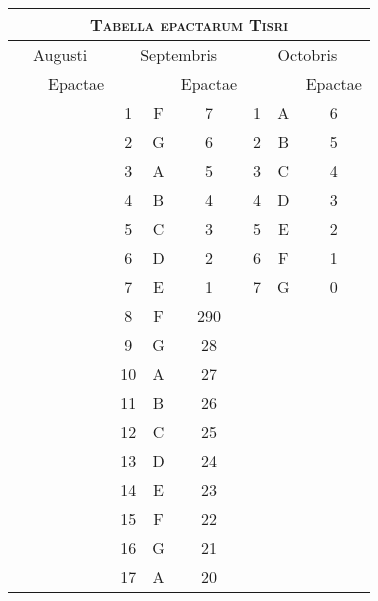 %
\normalsize
%
\centering
%
%
\newcommand{\hsa}[1]{\normalsize{#1}}
\newcommand{\hsb}[1]{\scriptsize{#1}}
%
\newcommand{\hdrB}{%
  \hsb{\ch{Epactae}{Dies}} &
  \hsb{\ch{Domini}{Litera Dominicalis}} &
  \hsb{Epactae}
}

\begin{tabular}{@{} ccc ccc ccc @{}}
\toprule
\multicolumn{9}{c}{\Large\textsc{Tabella epactarum Tisri}} \\
\toprule
   \multicolumn{3}{c}{\hsa{Augusti}} &
   \multicolumn{3}{c}{\hsa{Septembris}} &
   \multicolumn{3}{c}{\hsa{Octobris}} \\
\cmidrule(r){1-3} \cmidrule(lr){4-6} \cmidrule(l){7-9} 
   \hdrB & \hdrB & \hdrB \\
\midrule
   &   &    &  1 & F &  7 & 1 & A & 6 \\
   &   &    &  2 & G &  6 & 2 & B & 5 \\
   &   &    &  3 & A &  5 & 3 & C & 4 \\
   &   &    &  4 & B &  4 & 4 & D & 3 \\
   &   &    &  5 & C &  3 & 5 & E & 2 \\
   &   &    &  6 & D &  2 & 6 & F & 1 \\
   &   &    &  7 & E &  1 & 7 & G & 0 \\
   &   &    &  8 & F & 29\altsep{}0 \\
   &   &    &  9 & G & 28 \\
   &   &    & 10 & A & 27 \\
   &   &    & 11 & B & 26 \\
   &   &    & 12 & C & 25 \\
   &   &    & 13 & D & 24 \\
   &   &    & 14 & E & 23 \\
   &   &    & 15 & F & 22 \\
   &   &    & 16 & G & 21 \\
   &   &    & 17 & A & 20 \\

\end{tabular}

